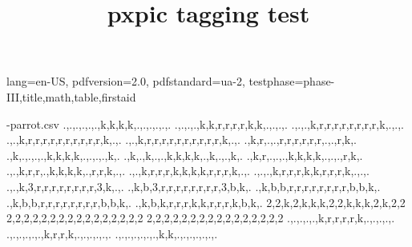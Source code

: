 \DocumentMetadata
  {
    lang=en-US,
    pdfversion=2.0,
    pdfstandard=ua-2,
    testphase={phase-III,title,math,table,firstaid}
  }
\begin{filecontents*}[overwrite]{\jobname-parrot.csv}
.,.,.,.,.,.,k,k,k,k,.,.,.,.,.,.
.,.,.,.,k,k,r,r,r,r,k,k,.,.,.,.
.,.,.,k,r,r,r,r,r,r,r,r,k,.,.,.
.,.,k,r,r,r,r,r,r,r,r,r,r,k,.,.
.,.,k,r,r,r,r,r,r,r,r,r,r,k,.,.
.,k,r,.,.,r,r,r,r,r,r,.,.,r,k,.
.,k,.,.,.,.,k,k,k,k,.,.,.,.,k,.
.,k,.,k,.,.,k,k,k,k,.,k,.,.,k,.
.,k,r,.,.,.,k,k,k,k,.,.,.,r,k,.
.,.,k,r,r,.,k,k,k,k,.,r,r,k,.,.
.,.,k,r,r,r,k,k,k,k,r,r,r,k,.,.
.,.,.,k,r,r,r,k,k,r,r,r,k,.,.,.
.,.,k,3,r,r,r,r,r,r,r,r,3,k,.,.
.,k,b,3,r,r,r,r,r,r,r,r,3,b,k,.
.,k,b,b,r,r,r,r,r,r,r,r,b,b,k,.
.,k,b,b,r,r,r,r,r,r,r,r,b,b,k,.
.,k,b,k,r,r,r,k,k,r,r,r,k,b,k,.
2,2,k,2,k,k,k,2,2,k,k,k,2,k,2,2
2,2,2,2,2,2,2,2,2,2,2,2,2,2,2,2
2,2,2,2,2,2,2,2,2,2,2,2,2,2,2,2
.,.,.,.,.,k,r,r,r,r,k,.,.,.,.,.
.,.,.,.,.,.,k,r,r,k,.,.,.,.,.,.
.,.,.,.,.,.,.,k,k,.,.,.,.,.,.,.
\end{filecontents*}

\documentclass{article}
\usepackage{pxpic}

\title{pxpic tagging test}

\pxpicsetup
  {
    mode = px
    ,colours = {k=black, r=[HTML]{9F393D}, g=green!75!black, b=[rgb]{0,0,1}}
    ,skip = .
    ,size = 10pt
  }



text
\pxpic
  {
    {.k}
    {kkk}
    {.k}
  }



